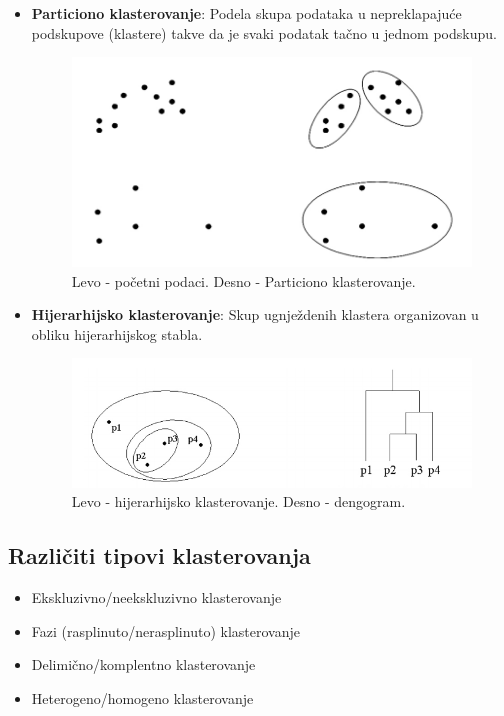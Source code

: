 \documentclass{article}
\begin{document}
\begin{itemize}

\item \textbf{Particiono klasterovanje}: Podela skupa podataka u nepreklapaju\'{c}e podskupove (klastere) takve da je svaki podatak ta\v{c}no u jednom podskupu.\\
\begin{figure}[h]
\selectfont
\centerline{\includegraphics[scale=0.35]{images/part_klast.png}}
\caption{Levo - po\v{c}etni podaci. Desno - Particiono klasterovanje.}
\end{figure}
\item \textbf{Hijerarhijsko klasterovanje}: Skup ugnje\v{z}denih klastera organizovan u obliku hijerarhijskog stabla.
\begin{figure}[h]
\selectfont
\centerline{\includegraphics[scale=0.45]{images/hie_clast.png}}
\caption{Levo - hijerarhijsko klasterovanje. Desno - dengogram.}
\end{figure}

\end{itemize}

\subsection{\selectfont Razli\v{c}iti tipovi klasterovanja}

\begin{itemize}
\item Ekskluzivno/neekskluzivno klasterovanje
\item Fazi (rasplinuto/nerasplinuto) klasterovanje
\item Delimi\v{c}no/komplentno klasterovanje
\item Heterogeno/homogeno klasterovanje
\end{itemize}
\end{document}

